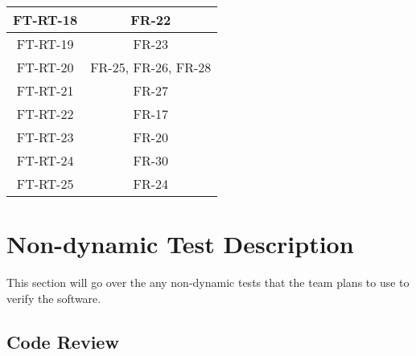\documentclass[12pt, titlepage]{article}
\begin{document}
\begin{table}[H]
{\begin{tabular}{|c|c|}
    \hline
    FT-RT-18 & FR-22\\
    \hline
    FT-RT-19 & FR-23\\
    \hline
    FT-RT-20 & FR-25, FR-26, FR-28\\
    \hline
    FT-RT-21 & FR-27\\
    \hline
    FT-RT-22 & FR-17\\
    \hline 
    FT-RT-23 & FR-20\\
    \hline
    FT-RT-24 & FR-30\\
    \hline
    FT-RT-25 & FR-24\\
    \hline
\end{tabular}}
\end{table}

\begin{table}[H]
  \centering
  \caption{Traceability Table for Non-Functional Test Cases and Requirements}
  \label{tab:NFRTrace}
\end{table}

\section{Non-dynamic Test Description}

This section will go over the any non-dynamic tests that the team plans to use to verify the software.

\subsection{Code Review}
\end{document}

